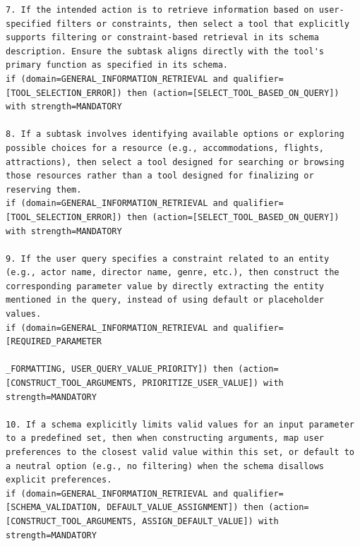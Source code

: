 \documentclass[11pt]{article}
\begin{document}
\begin{lstlisting}[style=rulestyle, caption={Sample rules learned from the BFCL: Live-Multiple dataset}]
7. If the intended action is to retrieve information based on user-specified filters or constraints, then select a tool that explicitly supports filtering or constraint-based retrieval in its schema description. Ensure the subtask aligns directly with the tool's primary function as specified in its schema.
if (domain=GENERAL_INFORMATION_RETRIEVAL and qualifier=[TOOL_SELECTION_ERROR]) then (action=[SELECT_TOOL_BASED_ON_QUERY]) with strength=MANDATORY

8. If a subtask involves identifying available options or exploring possible choices for a resource (e.g., accommodations, flights, attractions), then select a tool designed for searching or browsing those resources rather than a tool designed for finalizing or reserving them.
if (domain=GENERAL_INFORMATION_RETRIEVAL and qualifier=[TOOL_SELECTION_ERROR]) then (action=[SELECT_TOOL_BASED_ON_QUERY]) with strength=MANDATORY

9. If the user query specifies a constraint related to an entity (e.g., actor name, director name, genre, etc.), then construct the corresponding parameter value by directly extracting the entity mentioned in the query, instead of using default or placeholder values.
if (domain=GENERAL_INFORMATION_RETRIEVAL and qualifier=[REQUIRED_PARAMETER

_FORMATTING, USER_QUERY_VALUE_PRIORITY]) then (action=[CONSTRUCT_TOOL_ARGUMENTS, PRIORITIZE_USER_VALUE]) with strength=MANDATORY

10. If a schema explicitly limits valid values for an input parameter to a predefined set, then when constructing arguments, map user preferences to the closest valid value within this set, or default to a neutral option (e.g., no filtering) when the schema disallows explicit preferences.
if (domain=GENERAL_INFORMATION_RETRIEVAL and qualifier=[SCHEMA_VALIDATION, DEFAULT_VALUE_ASSIGNMENT]) then (action=[CONSTRUCT_TOOL_ARGUMENTS, ASSIGN_DEFAULT_VALUE]) with strength=MANDATORY


\end{lstlisting}
\end{document}
